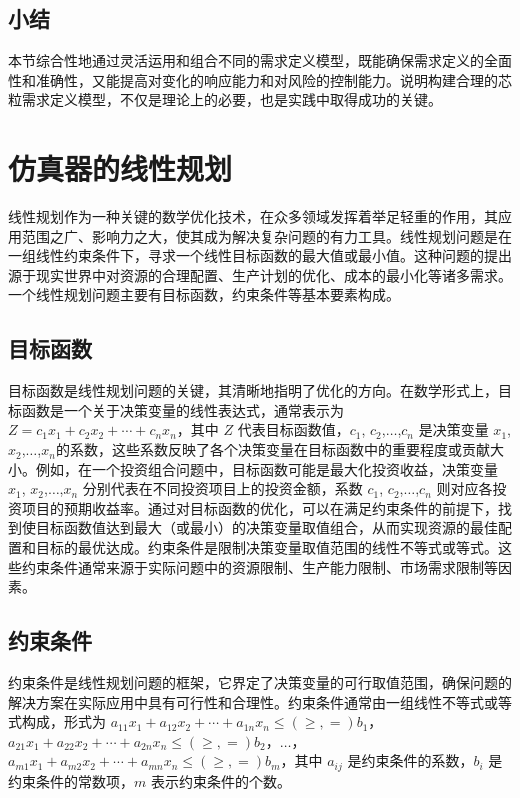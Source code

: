 \documentclass[bachelor]{thesis-uestc}
\begin{document}
\subsection{小结}
本节综合性地通过灵活运用和组合不同的需求定义模型，既能确保需求定义的全面性和准确性，又能提高对变化的响应能力和对风险的控制能力。说明构建合理的芯粒需求定义模型，不仅是理论上的必要，也是实践中取得成功的关键。

\section{仿真器的线性规划}

线性规划作为一种关键的数学优化技术，在众多领域发挥着举足轻重的作用，其应用范围之广、影响力之大，使其成为解决复杂问题的有力工具。线性规划问题是在一组线性约束条件下，寻求一个线性目标函数的最大值或最小值。这种问题的提出源于现实世界中对资源的合理配置、生产计划的优化、成本的最小化等诸多需求。一个线性规划问题主要有目标函数，约束条件等基本要素构成。

\subsection{目标函数}
目标函数是线性规划问题的关键，其清晰地指明了优化的方向。在数学形式上，目标函数是一个关于决策变量的线性表达式，通常表示为 $Z=c_1 x_1+c_2 x_2+\cdots+c_n x_n$，其中 $Z$ 代表目标函数值，$c_1$, $c_2$,$\ldots$,$c_n$ 是决策变量 $x_1$, $x_2$,$\ldots$,$x_n$的系数，这些系数反映了各个决策变量在目标函数中的重要程度或贡献大小。例如，在一个投资组合问题中，目标函数可能是最大化投资收益，决策变量 $x_1$, $x_2$,$\ldots$,$x_n$ 分别代表在不同投资项目上的投资金额，系数 $c_1$, $c_2$,$\ldots$,$c_n$ 则对应各投资项目的预期收益率。通过对目标函数的优化，可以在满足约束条件的前提下，找到使目标函数值达到最大（或最小）的决策变量取值组合，从而实现资源的最佳配置和目标的最优达成。约束条件是限制决策变量取值范围的线性不等式或等式。这些约束条件通常来源于实际问题中的资源限制、生产能力限制、市场需求限制等因素。


\subsection{约束条件}
约束条件是线性规划问题的框架，它界定了决策变量的可行取值范围，确保问题的解决方案在实际应用中具有可行性和合理性。约束条件通常由一组线性不等式或等式构成，形式为 $a_{11} x_1+a_{12} x_2+\cdots+a_{1n} x_n \leq(\geq, =) b_1$，$a_{21} x_1+a_{22} x_2+\cdots+a_{2n} x_n \leq(\geq, =) b_2$，$\ldots$，$a_{m1} x_1+a_{m2} x_2+\cdots+a_{mn} x_n \leq(\geq, =) b_m$，其中 $a_{ij}$ 是约束条件的系数，$b_i$ 是约束条件的常数项，$m$ 表示约束条件的个数。
\end{document}
